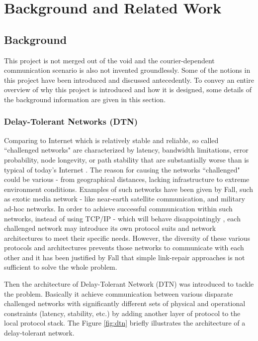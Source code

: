 \chapter{Background and Related Work}
\section{Background}
This project is not merged out of the void and the courier-dependent communication scenario is also not invented groundlessly. Some of the notions in this project have been introduced and discussed antecedently. To convey an entire overview of why this project is introduced and how it is designed, some details of the background information are given in this section.

\subsection{Delay-Tolerant Networks (DTN)}
Comparing to Internet which is relatively stable and reliable, so called ``challenged networks" are characterized by latency, bandwidth limitations, error probability, node longevity, or path stability that are substantially worse than is typical of today’s Internet \cite{Kevin}. The reason for causing the networks ``challenged" could be various - from geographical distances, lacking infrastructure to extreme environment conditions. Examples of such networks have been given by Fall, such as exotic media network - like near-earth satellite communication, and military ad-hoc networks. In order to achieve successful communication within such networks, instead of using TCP/IP - which will behave disappointingly \cite{Scott}, each challenged network may introduce its own protocol suits and network architectures to meet their specific needs. However, the diversity of these various protocols and architectures prevents those networks to communicate with each other and it has been justified by Fall \cite{Kevin} that simple link-repair approaches is not sufficient to solve the whole problem.

Then the architecture of Delay-Tolerant Network (DTN) was introduced to tackle the problem. Basically it achieve communication between various disparate challenged networks with significantly different sets of physical and operational constraints (latency, stability, etc.) by adding another layer of protocol to the local protocol stack. The Figure \ref{fig:dtn} briefly illustrates the architecture of a delay-tolerant network.

